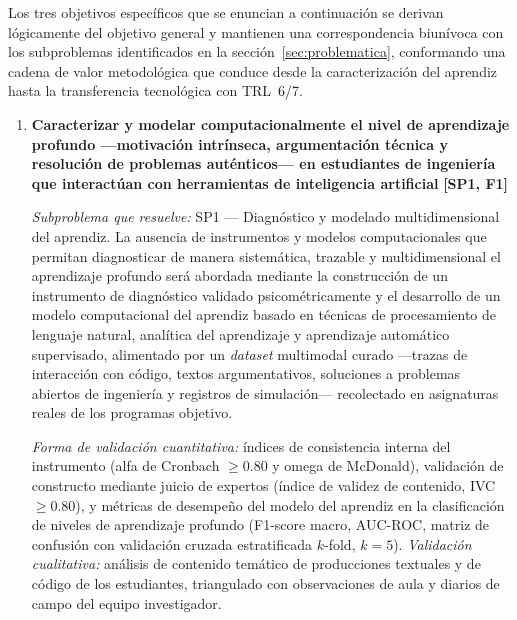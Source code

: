 
Los tres objetivos específicos que se enuncian a continuación se derivan lógicamente del objetivo general y
mantienen una correspondencia biunívoca con los subproblemas identificados en la
sección~\ref{sec:problematica}, conformando una cadena de valor metodológica que conduce desde la
caracterización del aprendiz hasta la transferencia tecnológica con TRL~6/7.

\begin{enumerate}[leftmargin=*, itemsep=12pt]

    \item \textbf{Caracterizar y modelar computacionalmente el nivel de aprendizaje profundo
    —motivación intrínseca, argumentación técnica y resolución de problemas auténticos— en
    estudiantes de ingeniería que interactúan con herramientas de inteligencia artificial}
    \hfill \textbf{[SP1, F1]}

    \textit{Subproblema que resuelve:} SP1 — Diagnóstico y modelado multidimensional del
    aprendiz. La ausencia de instrumentos y modelos computacionales que permitan diagnosticar de
    manera sistemática, trazable y multidimensional el aprendizaje profundo será abordada mediante
    la construcción de un instrumento de diagnóstico validado psicométricamente y el desarrollo de
    un modelo computacional del aprendiz basado en técnicas de procesamiento de lenguaje natural,
    analítica del aprendizaje y aprendizaje automático supervisado, alimentado por un
    \emph{dataset} multimodal curado —trazas de interacción con código, textos argumentativos,
    soluciones a problemas abiertos de ingeniería y registros de simulación— recolectado en
    asignaturas reales de los programas objetivo.

    \textit{Forma de validación cuantitativa:} índices de consistencia interna del instrumento
    (alfa de Cronbach $\geq 0.80$ y omega de McDonald), validación de constructo mediante juicio
    de expertos (índice de validez de contenido, IVC $\geq 0.80$), y métricas de desempeño del
    modelo del aprendiz en la clasificación de niveles de aprendizaje profundo (F1-score macro,
    AUC-ROC, matriz de confusión con validación cruzada estratificada $k$-fold, $k=5$).
    \textit{Validación cualitativa:} análisis de contenido temático de producciones textuales y de
    código de los estudiantes, triangulado con observaciones de aula y diarios de campo del equipo
    investigador.


\end{enumerate}
